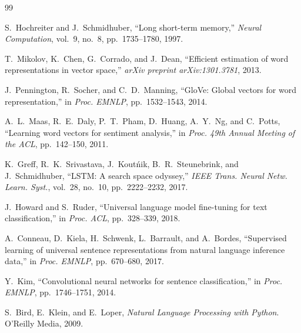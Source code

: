\documentclass[letterpaper, 10pt, conference]{ieeeconf}
\begin{document}
\clearpage

\begin{thebibliography}{99}

S.~Hochreiter and J.~Schmidhuber,
``Long short-term memory,''
\textit{Neural Computation}, vol.~9, no.~8, pp.~1735--1780, 1997.

T.~Mikolov, K.~Chen, G.~Corrado, and J.~Dean,
``Efficient estimation of word representations in vector space,''
\textit{arXiv preprint arXiv:1301.3781}, 2013.

J.~Pennington, R.~Socher, and C.~D.~Manning,
``GloVe: Global vectors for word representation,''
in \textit{Proc. EMNLP}, pp.~1532--1543, 2014.

A.~L.~Maas, R.~E.~Daly, P.~T.~Pham, D.~Huang, A.~Y.~Ng, and C.~Potts,
``Learning word vectors for sentiment analysis,''
in \textit{Proc. 49th Annual Meeting of the ACL}, pp.~142--150, 2011.

K.~Greff, R.~K.~Srivastava, J.~Kout\'nik, B.~R.~Steunebrink, and J.~Schmidhuber,
``LSTM: A search space odyssey,''
\textit{IEEE Trans. Neural Netw. Learn. Syst.}, vol.~28, no.~10,
pp.~2222--2232, 2017.

J.~Howard and S.~Ruder,
``Universal language model fine-tuning for text classification,''
in \textit{Proc. ACL}, pp.~328--339, 2018.

A.~Conneau, D.~Kiela, H.~Schwenk, L.~Barrault, and A.~Bordes,
``Supervised learning of universal sentence representations from natural
language inference data,''
in \textit{Proc. EMNLP}, pp.~670--680, 2017.

Y.~Kim,
``Convolutional neural networks for sentence classification,''
in \textit{Proc. EMNLP}, pp.~1746--1751, 2014.

S.~Bird, E.~Klein, and E.~Loper,
\textit{Natural Language Processing with Python}.
O'Reilly Media, 2009.

\end{thebibliography}
\end{document}
